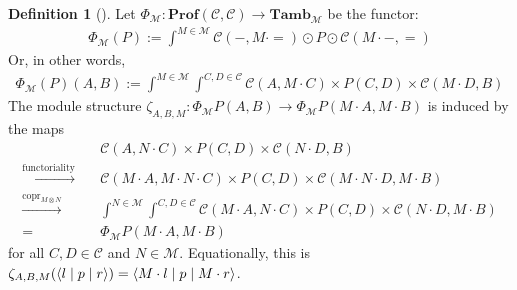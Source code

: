 \documentclass[11pt,letterpaper]{article}
\theoremstyle{plain}
\theoremstyle{definition}
\newtheorem{definition}[theorem]{Definition}
\newcommand{\C}{\mathscr{C}}
\newcommand{\M}{\mathscr{M}}
\newcommand{\Pastro}{\Phi}
\newcommand{\Prof}{\mathbf{Prof}}
\newcommand{\Tamb}{\mathbf{Tamb}}
\DeclareMathOperator{\copr}{copr}
\newcommand{\act}{\cdot}
\newcommand{\repthree}[3]{{\ensuremath \langle #1 \mid #2 \mid #3 \rangle}}
\begin{document}
\begin{definition}[{\cite[Section 5]{Doubles}}]
  Let $\Pastro_\M : \Prof(\C, \C) \to \Tamb_\M$ be the functor:
  \begin{align*}
    \Pastro_\M(P) := \int^{M \in \M}  \C(-, M\act {=}) \odot P \odot \C(M\act -, {=})
  \end{align*}
  Or, in other words,
  \begin{align*}
    \Pastro_\M(P)(A,B) := \int^{M \in \M} \int^{C,D \in \C} \C(A, M\act C) \times P(C,D) \times  \C(M \act D, B)
  \end{align*}
  The module structure $\zeta_{A,B,M} : \Pastro_\M P(A,B) \to \Pastro_\M P (M\act A, M\act B)
  $ is induced by the maps
  \begin{align*}
    &\C(A, N\act C) \times P(C,D) \times  \C(N\act D, B) \\
    \xrightarrow{\text{functoriality}} \quad& \C(M\act A, M\act N\act C) \times P(C,D) \times  \C(M\act N\act D, M\act B) \\
    \xrightarrow{\copr_{M\otimes N}} \quad&\int^{N \in \M} \int^{C,D \in \C} \C(M\act A, N\act C) \times P(C,D) \times  \C(N\act D, M\act B) \\
    = \quad&\Pastro_\M P (M \act A, M \act B)
  \end{align*}
  for all $C, D \in \C$ and $N \in \M$. Equationally, this is $\zeta_{A,B,M}(\repthree{l}{p}{r} ) = \repthree{M\act l}{p}{M\act r} $.
\end{definition}
\end{document}
